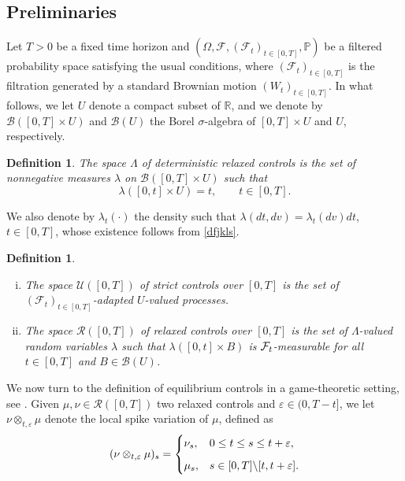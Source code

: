 \documentclass[12pt]{article}
\newtheorem{definition}[prop]{Definition}
\theoremstyle{named}
\numberwithin{equation}{section}
\def\P{{\mathord{\mathbb P}}}
\let\oldcitet=\citet
\renewcommand{\cite}[1]{\textcolor[rgb]{0,0,1}{\oldcitet{#1}}}
\renewcommand{\citet}[1]{\textcolor[rgb]{0,0,1}{\oldcitet{#1}}}
\begin{document}
\subsection*{Preliminaries}

Let $T>0$ be a fixed time horizon and $(\Omega,\mathcal{F}, (\mathcal{F}_t)_{t \in [0,T]}, \P )$ be a filtered probability space satisfying the usual conditions,
where $(\mathcal{F}_t)_{t \in [0,T]}$ is the filtration generated by a standard
Brownian motion $(W_t)_{t\in [0,T]}$.
In what follows, we let $U$ denote a compact subset of $\mathbb{R}$,
and we denote by ${\mathcal B}([0,T]\times U)$ and ${\mathcal B}(U)$
 the Borel $\sigma$-algebra of $[0,T]\times U$ and $U$, respectively.
\begin{definition}
  The space $\Lambda$
 of deterministic relaxed controls is the set of
 nonnegative measures $\lambda$ on $\mathcal{B} ([0,T]\times U) $ such that
 \begin{equation}
   \label{dfjkls}
 \lambda([0,t] \times U) = t, \qquad t \in [0,T].
\end{equation}
\end{definition}
\noindent
 We also denote by $\lambda_t( \cdot )$
 the density such that
 $\lambda(dt, dv) = \lambda_t(dv)dt$, $t\in [0,T]$,
 whose existence follows from \eqref{dfjkls}.
\begin{definition}\label{relaxed_control_def}
  \begin{enumerate}[i)]
  \item
    The space $\mathcal{U}([0,T])$ of strict controls over $[0,T]$
    is the set of $({\mathcal F}_t)_{t\in [0,T]}$-adapted
 $U$-valued processes.
\item
 The space ${\mathcal R}([0,T])$ of relaxed controls over $[0,T]$
 is the set of
 $\Lambda$-valued random variables
 $\lambda$ such that $\lambda([0,t] \times B)$ is ${\cal F}_t$-measurable for all $t \in [0,T]$
 and $B\in {\mathcal B}(U)$.
  \end{enumerate}
\end{definition}
\noindent
We now turn to the definition of equilibrium controls
in a game-theoretic setting,
see
 \cite{ekeland2006being}.
 Given $\mu , \nu \in \mathcal{R}([0,T])$ two relaxed controls
 and $\varepsilon \in (0,T-t]$, we let
 $\nu \otimes_{t,\varepsilon } \mu$ denote
 the local spike variation of $\mu$,
 defined as
\begin{equation}
\nonumber %
( \nu \otimes_{t,\varepsilon } \mu )_s=
\begin{cases}
  \nu_s, & 0 \leq t \leq s \leq t+\varepsilon ,
  \medskip
  \\
  \mu_s, &
  s \in [0,T] \char`\\ [t, t+\varepsilon  ].
\end{cases}
\end{equation}
\end{document}
